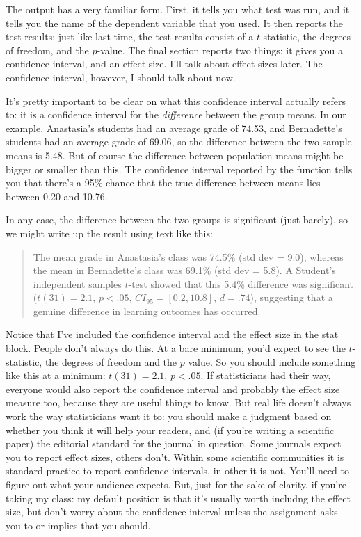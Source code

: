 The output has a very familiar form. First, it tells you what test was run, and it tells you the name of the dependent variable that you used. It then reports the test results: just like last time, the test results consist of a $t$-statistic, the degrees of freedom, and the $p$-value. The final section reports two things: it gives you a confidence interval, and an effect size. I'll talk about effect sizes later. The confidence interval, however, I should talk about now. 

It's pretty important to be clear on what this confidence interval actually refers to: it is a confidence interval for the {\it difference} between the group means. In our example, Anastasia's students had an average grade of 74.53, and Bernadette's students had an average grade of 69.06, so the difference between the two sample means is 5.48. But of course the difference between population means might be bigger or smaller than this. The confidence interval reported by the  function tells you that there's a 95\% chance that the true difference between means lies between 0.20 and 10.76.  

In any case, the difference between the two groups is significant (just barely), so we might write up the result using text like this:
\begin{quote}
The mean grade in Anastasia's class was 74.5\% (std dev = 9.0), whereas the mean in Bernadette's class was 69.1\% (std dev = 5.8). A Student's independent samples $t$-test showed that this 5.4\% difference was significant ($t(31) = 2.1$, $p<.05$, $CI_{95} = [0.2, 10.8]$, $d = .74$), suggesting that a genuine difference in learning outcomes has occurred.  
\end{quote}
Notice that I've included the confidence interval and the effect size in the stat block. People don't always do this. At a bare minimum, you'd expect to see the $t$-statistic, the degrees of freedom and the $p$ value. So you should include something like this at a minimum: $t(31) = 2.1$, $p<.05$. If statisticians had their way, everyone would also report the confidence interval and probably the effect size measure too, because they are useful things to know. But real life doesn't always work the way statisticians want it to: you should make a judgment based on whether you think it will help your readers, and (if you're writing a scientific paper) the editorial standard for the journal in question. Some journals expect you to report effect sizes, others don't. Within some scientific communities it is standard practice to report confidence intervals, in other it is not. You'll need to figure out what your audience expects. But, just for the sake of clarity, if you're taking my class: my default position is that it's usually worth includng the effect size, but don't worry about the confidence interval unless the assignment asks you to or implies that you should.

